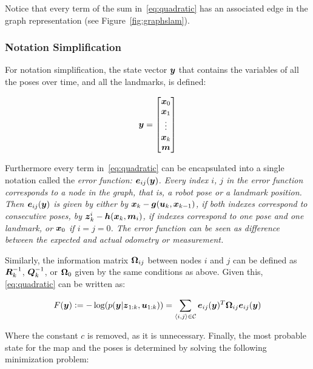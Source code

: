 Notice that every term of the sum in~\eqref{eq:quadratic} has an associated edge in the graph representation (see Figure~\ref{fig:graphslam}). 

\subsubsection{Notation Simplification}

For notation simplification, the state vector $\boldsymbol{y}$ that contains the variables of all the poses over time, and all the landmarks, is defined:

\begin{equation}
\boldsymbol{y} = \begin{bmatrix}
\boldsymbol{x}_0\\
\boldsymbol{x}_1\\
\vdots\\
\boldsymbol{x}_k\\
\boldsymbol{m}
\end{bmatrix}
\end{equation}

Furthermore every term in~\eqref{eq:quadratic} can be encapsulated into a single notation called the \it{error function}: $\boldsymbol{e}_{ij}(\boldsymbol{y})$. Every index $i$, $j$ in the error function corresponds to a node in the graph, that is, a robot pose or a landmark position. Then $\boldsymbol{e}_{ij}(\boldsymbol{y})$ is given by either by $\boldsymbol{x}_k-\boldsymbol{g}(\boldsymbol{u}_k,\boldsymbol{x}_{k-1})$, if both indexes correspond to consecutive poses, by $\boldsymbol{z}_k^i-\boldsymbol{h}(\boldsymbol{x}_k,\boldsymbol{m}_i)$, if indexes correspond to one pose and one landmark, or $\boldsymbol{x}_0$ if $i=j=0$. The error function can be seen as difference between the expected and actual odometry or measurement. 

Similarly, the information matrix $\boldsymbol{\Omega}_{ij}$ between nodes $i$ and $j$ can be defined as $\boldsymbol{R}_k^{-1}$, $\boldsymbol{Q}_k^{-1}$, or $\boldsymbol{\Omega}_0$ given by the same conditions as above. Given this,\eqref{eq:quadratic} can be written as:

\begin{equation}
F(\boldsymbol{y}) \vcentcolon= -\log(p(\boldsymbol{y}|\boldsymbol{z}_{1:k},\boldsymbol{u}_{1:k})) = \sum_{\left<i,j\right>\in\mathcal{C}}\boldsymbol{e}_{ij}(\boldsymbol{y})^T\boldsymbol{\Omega}_{ij} \boldsymbol{e}_{ij}(\boldsymbol{y}) 
\label{eq:simplified}
\end{equation}

\noindent
Where the constant $c$ is removed, as it is unnecessary. Finally, the most probable state for the map and the poses is determined by solving the following minimization problem: 

